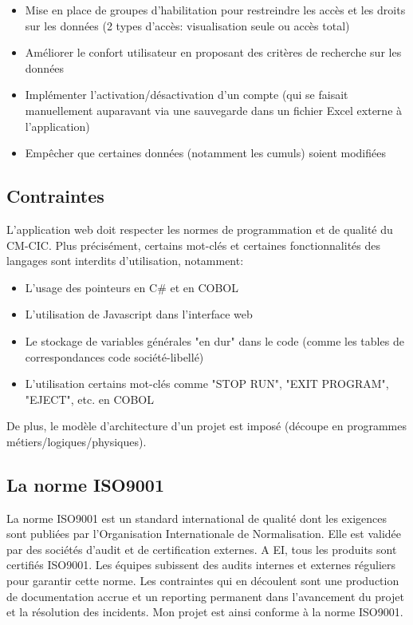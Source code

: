 \documentclass[a4paper,french,12pt]{article}
\begin{document}
		\begin{itemize}
			\item Mise en place de groupes d’habilitation pour restreindre les accès et les droits sur les données (2 types d'accès: visualisation seule ou accès total)
			\item Améliorer le confort utilisateur en proposant des critères de recherche sur les données
			\item Implémenter l’activation/désactivation d’un compte (qui se faisait manuellement auparavant via une sauvegarde dans un fichier Excel externe à l'application)
			\item Empêcher que certaines données (notamment les cumuls) soient modifiées
		\end{itemize}
		
	\subsection{Contraintes}
		
		L'application web doit respecter les normes de programmation et de qualité du CM-CIC. Plus précisément, certains mot-clés et certaines fonctionnalités des langages sont interdits d'utilisation,
		notamment:
		
		\begin{itemize}
			\item L'usage des pointeurs en C\# et en COBOL
			\item L'utilisation de Javascript dans l'interface web
			\item Le stockage de variables générales "en dur" dans le code (comme les tables de correspondances code société-libellé)
			\item L'utilisation certains mot-clés comme "STOP RUN", "EXIT PROGRAM", "EJECT", etc. en COBOL
		\end{itemize}
		
		De plus, le modèle d'architecture d'un projet est imposé (découpe en programmes métiers/logiques/physiques).
	
	\subsection{La norme ISO9001}
	
		La norme ISO9001 est un standard international  de qualité dont les exigences sont publiées par l’Organisation Internationale de Normalisation.
		Elle est validée par des sociétés d’audit et de certification externes. 
		A EI, tous les produits sont certifiés ISO9001. Les équipes subissent des audits internes et externes réguliers pour garantir cette norme. 
		Les contraintes qui en découlent sont une production de documentation accrue et un reporting permanent dans l’avancement du projet et la résolution des incidents.
		Mon projet est ainsi conforme à la norme ISO9001.
\end{document}
